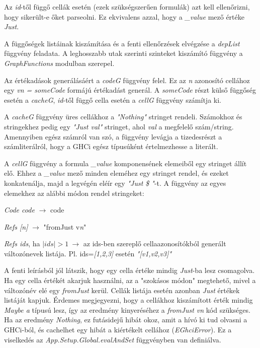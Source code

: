 Az \textit{id}-től függő cellák esetén (ezek szükségszerűen formulák) azt kell ellenőrizni, hogy sikerült-e őket parseolni. Ez ekvivalens azzal, hogy a \textit{\_value} mező értéke \textit{Just}.

A függőségek listáinak kiszámítása és a fenti ellenőrzések elvégzése a \textit{depList} függvény feladata. A leghosszabb utak szerinti szinteket kiszámító függvény a \textit{GraphFunctions} modulban szerepel. 

Az értékadások generálásáért a \textit{codeG} függvény felel. Ez az \textit{n} azonosító cellához egy \textit{vn = someCode} formájú értékadást generál. A \textit{someCode} részt külső függőség esetén a \textit{cacheG}, \textit{id}-től függő cella esetén a \textit{cellG} függvény számítja ki.

A \textit{cacheG} függvény üres cellákhoz a \textit{"Nothing"} stringet rendeli. Számokhoz és stringekhez pedig egy \textit{"Just val"} stringet, ahol \textit{val} a megfelelő szám/string. Amennyiben egész számról van szó, a függvény levágja a tizedesrészt a számliterálról, hogy a GHCi egész típusúként értelmezhesse a literált.

A \textit{cellG} függvény a formula \textit{\_value} komponensének elemeiből egy stringet állít elő. Ehhez a \textit{\_value} mező minden eleméhez egy stringet rendel, és ezeket konkatenálja, majd a legvégén eléír egy \textit{"Just \$ "}-t. A függvény az egyes elemekhez az alábbi módon rendel stringeket:
\begin{compactenum}
	\item \textit{Code code} $\rightarrow$ code
	\item \textit{Refs [n]} $\rightarrow$ "fromJust v\textit{n}"
	\item \textit{Refs ids}, ha $|ids| > 1 \ \rightarrow$ az ids-ben szereplő cellaazonosítókból generált változónevek listája. Pl. ids=\textit{[1,2,3]} esetén \textit{"[v1,v2,v3]"}
\end{compactenum}

A fenti leírásból jól látszik, hogy egy cella értéke mindig \textit{Just}-ba lesz csomagolva. Ha egy cella értékét akarjuk használni, az a "szokásos módon" megtehető, mivel a változónév elé egy \textit{fromJust} kerül. Cellák listája esetén azonban \textit{Just} értékek listáját kapjuk. Érdemes megjegyezni, hogy a cellákhoz kiszámított érték mindig \textit{Maybe a} típusú lesz, így az eredmény kinyeréséhez a \textit{fromJust vn} kód szükséges. Ha az eredmény \textit{Nothing}, ez futásidejű hibát okoz, amit a hívó ki tud olvasni a GHCi-ból, és cachelhet egy hibát a kiértékelt cellához (\textit{EGhciError}). Ez a viselkedés az \textit{App.Setup.Global.evalAndSet} függvényben van definiálva.

